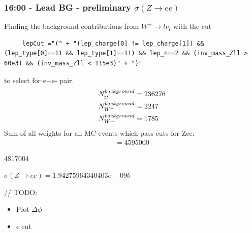 \subsubsection*{16:00 - Lead BG - preliminary $\sigma (Z \rightarrow ee)$}
Finding the background contributions from $W^+ \rightarrow l\nu_l $ with the cut 
\begin{lstlisting}
     lepCut ="(" + "(lep_charge[0] != lep_charge[1]) && (lep_type[0]==11 && lep_type[1]==11) && lep_n==2 && (inv_mass_Zll > 60e3) && (inv_mass_Zll < 115e3)" + ")"
\end{lstlisting}
to select for e+e- pair.
\begin{align}
    N^{background}_{t\Bar{t}} &= 236276
    \\
    N^{background}_{W^+} &= 2247
    \\
    N^{background}_{W-} &= 1785
\end{align}
Sum of all weights for all MC events which pass cuts for Zee:
\begin{align*}
    = 4595000
\end{align*}
 
4817004

$\sigma(Z \rightarrow ee) = 1.94275964340403e-09 b$

//
TODO: 
\begin{itemize}
    \item Plot $ \Delta \phi$ 
    \item $\epsilon$ cut
\end{itemize}



